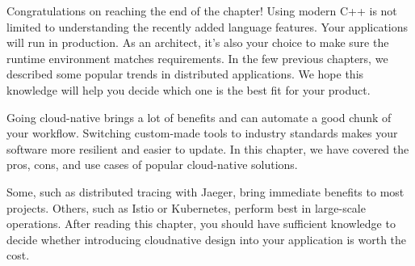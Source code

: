 Congratulations on reaching the end of the chapter! Using modern C++ is not limited to understanding the recently added language features. Your applications will run in production. As an architect, it's also your choice to make sure the runtime environment matches requirements. In the few previous chapters, we described some popular trends in distributed applications. We hope this knowledge will help you decide which one is the best fit for your product.

Going cloud-native brings a lot of benefits and can automate a good chunk of your workflow. Switching custom-made tools to industry standards makes your software more resilient and easier to update. In this chapter, we have covered the pros, cons, and use cases of popular cloud-native solutions.

Some, such as distributed tracing with Jaeger, bring immediate benefits to most projects. Others, such as Istio or Kubernetes, perform best in large-scale operations. After reading this chapter, you should have sufficient knowledge to decide whether introducing cloudnative design into your application is worth the cost.
